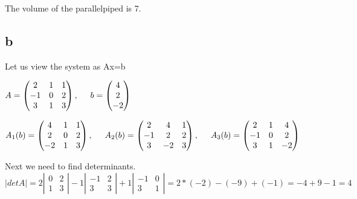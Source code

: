\documentclass{article}
\begin{document}
The volume of the parallelpiped is 7.

\subsection*{b}

Let us view the system as Ax=b

$A=
\left (
    \begin{matrix}
        2 & 1 & 1\\
        -1 & 0 & 2\\
        3 & 1 & 3
    \end{matrix}
\right )
, \hspace{5 mm}
b=
\left (
    \begin{matrix}
        4\\
        2\\
        -2
    \end{matrix}
\right )
$

$A_{1}(b)=
\left (
    \begin{matrix}
        4 & 1 & 1\\
        2 & 0 & 2\\
        -2 & 1 & 3
    \end{matrix}
\right )
,\hspace{5 mm}
A_{2}(b) =
\left (
    \begin{matrix}
        2 & 4 & 1\\
        -1 & 2 & 2\\
        3 & -2 & 3
    \end{matrix}
\right )
,\hspace{5 mm} 
A_{3}(b) =
\left (
    \begin{matrix}
        2 & 1 & 4\\
        -1 & 0 & 2\\
        3 & 1 & -2
    \end{matrix}
\right )
$

Next we need to find determinants.\\
$|detA| = 2
\left |
    \begin{matrix}
        0 & 2\\
        1 & 3
    \end{matrix}
\right |
- 1
\left |
    \begin{matrix}
        -1 & 2\\
        3 & 3
    \end{matrix}
\right |
+ 1
\left |
    \begin{matrix}
        -1 & 0\\
        3 & 1
    \end{matrix}
\right |
=
2*(-2) - (-9) + (-1)
=
-4 + 9 - 1
=
4
$
\end{document}
